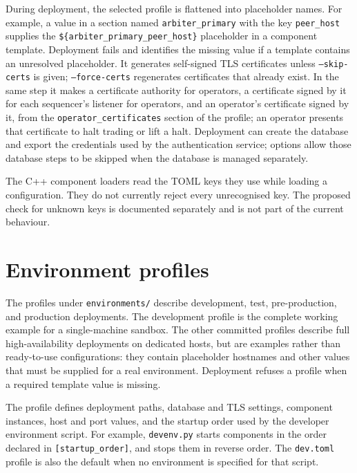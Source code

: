 During deployment, the selected profile is flattened into placeholder names.
For example, a value in a section named \texttt{arbiter\_primary} with the key
\texttt{peer\_host} supplies the
\texttt{\$\{arbiter\_primary\_peer\_host\}} placeholder in a component
template. Deployment fails and identifies the missing value if a template
contains an unresolved placeholder. It generates self-signed TLS certificates
unless \texttt{--skip-certs} is given; \texttt{--force-certs} regenerates
certificates that already exist. In the same step it makes a certificate
authority for operators, a certificate signed by it for each sequencer's
listener for operators, and an operator's certificate signed by it, from the
\texttt{operator\_certificates} section of the profile; an operator presents
that certificate to halt trading or lift a halt. Deployment can create the database and export
the credentials used by the authentication service; options allow those
database steps to be skipped when the database is managed separately.

The C++ component loaders read the TOML keys they use while loading a
configuration. They do not currently reject every unrecognised key. The
proposed check for unknown keys is documented separately and is not part of
the current behaviour.

\section{Environment profiles}
\label{sec:build_release_deployment:profiles}

The profiles under \texttt{environments/} describe development, test,
pre-production, and production deployments. The development profile is the
complete working example for a single-machine sandbox. The other committed
profiles describe full high-availability deployments on dedicated hosts, but
are examples rather than ready-to-use configurations: they contain placeholder
hostnames and other values that must be supplied for a real environment.
Deployment refuses a profile when a required template value is missing.

The profile defines deployment paths, database and TLS settings, component
instances, host and port values, and the startup order used by the developer
environment script. For example, \texttt{devenv.py} starts components in the
order declared in \texttt{[startup\_order]}, and stops them in reverse order.
The \texttt{dev.toml} profile is also the default when no environment is
specified for that script.

